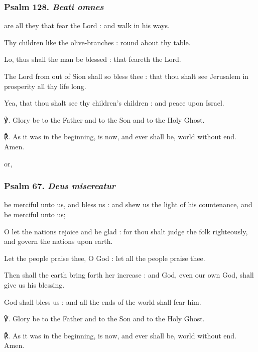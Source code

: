 \subsubsection{Psalm 128. \textit{Beati omnes}}
 are all they that fear the Lord : and walk in his ways.\par
{}
Thy children like the olive-branches : round about thy table.\par
{}Lo, thus shall the man be blessed : that feareth the Lord.\par
{}The Lord from out of Sion shall so bless thee : that thou shalt see Jerusalem in prosperity all thy life long.\par
{}Yea, that thou shalt see thy children's children : and peace upon Israel.\par
     ℣. Glory be to the Father and to the Son and to the Holy Ghost.\par
    ℟. As it was in the beginning, is now, and ever shall be, world without end. Amen.
    
\begin{inhead}
    or,
\end{inhead}

\subsubsection{Psalm 67. \textit{Deus misereatur}}
 be merciful unto us, and bless us : and shew us the light of his countenance, and be merciful unto us;\par
{}
O let the nations rejoice and be glad : for thou shalt judge the folk righteously, and govern the nations upon earth.\par
{}Let the people praise thee, O God : let all the people praise thee.\par
{}Then shall the earth bring forth her increase : and God, even our own God, shall give us his blessing.\par
{}God shall bless us : and all the ends of the world shall fear him.\par
    ℣. Glory be to the Father and to the Son and to the Holy Ghost.\par
    ℟. As it was in the beginning, is now, and ever shall be, world without end. Amen.

